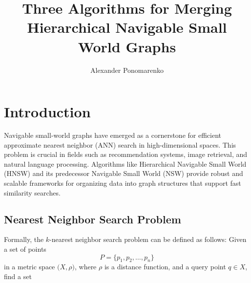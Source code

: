 \documentclass{article}
\title{Three Algorithms for Merging Hierarchical Navigable Small World Graphs}
\author[1]{Alexander Ponomarenko}
\date{}
\affil[1]{HSE Univerity}
\begin{document}
\maketitle



\section{Introduction}

Navigable small-world graphs have emerged as a cornerstone for efficient approximate nearest neighbor (ANN) search in high-dimensional spaces. This problem is crucial in fields such as recommendation systems, image retrieval, and natural language processing. Algorithms like Hierarchical Navigable Small World (HNSW) \cite{hnsw} and its predecessor Navigable Small World (NSW) \cite{nsw2011,nsw2012,nsw2014} provide robust and scalable frameworks for organizing data into graph structures that support fast similarity searches.

\subsection{Nearest Neighbor Search Problem}





Formally, the \(k\)-nearest neighbor search problem can be defined as follows:
Given a set of points
\[
P = \{p_1, p_2, \dots, p_n\}
\]
in a metric space \(\bigl(X, \rho\bigr)\), where \(\rho\) is a distance function, and a query point \(q \in X\), find a set
\end{document}

